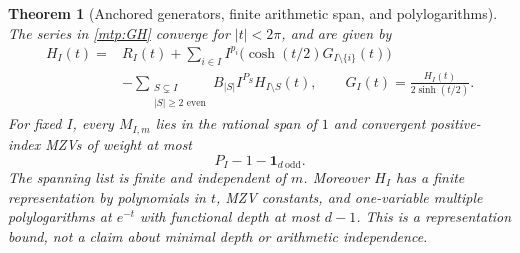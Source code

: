 \documentclass[11pt,letterpaper]{article}
\numberwithin{equation}{section}
\newtheorem{theorem}{Theorem}[section]
\theoremstyle{definition}
\theoremstyle{remark}
\begin{document}
\begin{theorem}[Anchored generators, finite arithmetic span, and polylogarithms]
\label{mtp:generator}
The series in \eqref{mtp:GH} converge for $|t|<2\pi$, and are given by
\begin{equation}\label{mtp:generator-formula}
 \boxed{\begin{aligned}
 H_I(t)={}&R_I(t)
       +\sum_{i\in I}I^{p_i}\bigl(\cosh(t/2)G_{I\setminus\{i\}}(t)\bigr)\\
       &-\sum_{\substack{S\subsetneq I\\|S|\ge2\text{ even}}}
                     B_{|S|}I^{P_S}H_{I\setminus S}(t),
       \qquad G_I(t)=\frac{H_I(t)}{2\sinh(t/2)}.
 \end{aligned}}
\end{equation}
For fixed $I$, every $M_{I,m}$ lies in the rational span of $1$ and
convergent positive-index MZVs of weight at most
\begin{equation}\label{mtp:weight-bound}
                         P_I-1-\mathbf1_{d\ \mathrm{odd}}.
\end{equation}
The spanning list is finite and independent of $m$.
Moreover $H_I$ has a finite representation by polynomials in $t$,
MZV constants, and one-variable multiple polylogarithms at $e^{-t}$
with functional depth at most $d-1$. This is a representation bound,
not a claim about minimal depth or arithmetic independence.
\end{theorem}
\end{document}
